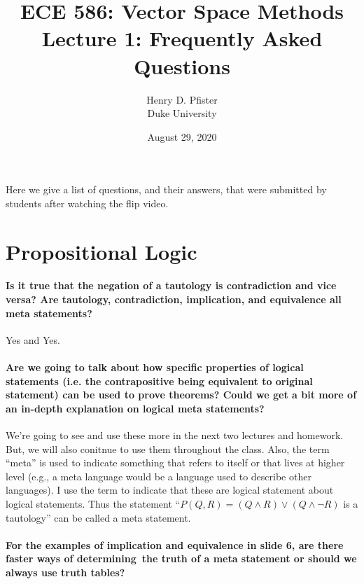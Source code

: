 \documentclass[10pt,english]{article}
\begin{document}
\title{ECE 586: Vector Space Methods \\ Lecture 1: Frequently Asked Questions}
\author{Henry D. Pfister \\ Duke University}
\date{August 29, 2020}

\maketitle

Here we give a list of questions, and their answers, that were submitted by students after watching the flip video.

\section{Propositional Logic}


\paragraph{Is it true that the negation of a tautology is contradiction and vice versa? Are tautology, contradiction, implication, and equivalence all meta statements?}

Yes and Yes.

\paragraph{Are we going to talk about how specific properties of logical statements (i.e. the contrapositive being equivalent to original statement) can be used to prove theorems? Could we get a bit more of an in-depth explanation on logical meta statements?}

We're going to see and use these more in the next two lectures and homework.  But, we will also conitnue to use them throughout the class.
Also, the term ``meta'' is used to indicate something that refers to itself or that lives at higher level (e.g., a meta language would be a language used to describe other languages).
I use the term to indicate that these are logical statement about logical statements.
Thus the statement ``$P(Q,R) = (Q \wedge R) \vee (Q \wedge \neg R)$ is a tautology'' can be called a meta statement.

\paragraph{For the examples of implication and equivalence in slide 6, are there faster ways of determining the truth of a meta statement or should we always use truth tables?}
\end{document}
